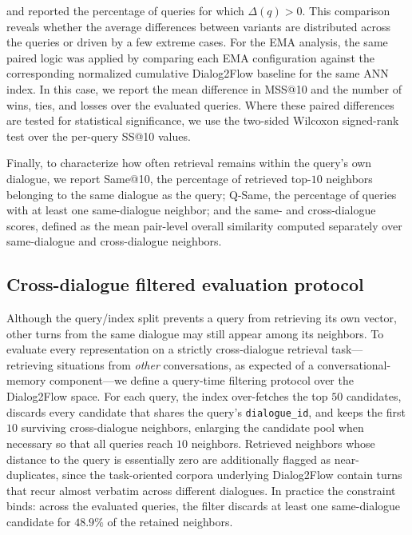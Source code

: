 \documentclass[runningheads]{llncs}
\begin{document}
\noindent and reported the percentage of queries for which $\Delta(q)>0$. This comparison reveals whether the average differences between variants are distributed across the queries or driven by a few extreme cases. For the EMA analysis, the same paired logic was applied by comparing each EMA configuration against the corresponding normalized cumulative Dialog2Flow baseline for the same ANN index. In this case, we report the mean difference in MSS@10 and the number of wins, ties, and losses over the evaluated queries. Where these paired differences are tested for statistical significance, we use the two-sided Wilcoxon signed-rank test over the per-query SS@10 values.

Finally, to characterize how often retrieval remains within the query's own dialogue, we report Same@10, the percentage of retrieved top-$10$ neighbors belonging to the same dialogue as the query; Q-Same, the percentage of queries with at least one same-dialogue neighbor; and the same- and cross-dialogue scores, defined as the mean pair-level overall similarity computed separately over same-dialogue and cross-dialogue neighbors.

\subsection{Cross-dialogue filtered evaluation protocol}
\label{sec:crossdlg_protocol}

Although the query/index split prevents a query from retrieving its own vector, other turns from the same dialogue may still appear among its neighbors. To evaluate every representation on a strictly cross-dialogue retrieval task---retrieving situations from \emph{other} conversations, as expected of a conversational-memory component---we define a query-time filtering protocol over the Dialog2Flow space. For each query, the index over-fetches the top $50$ candidates, discards every candidate that shares the query's \texttt{dialogue\_id}, and keeps the first $10$ surviving cross-dialogue neighbors, enlarging the candidate pool when necessary so that all queries reach $10$ neighbors. Retrieved neighbors whose distance to the query is essentially zero are additionally flagged as near-duplicates, since the task-oriented corpora underlying Dialog2Flow contain turns that recur almost verbatim across different dialogues. In practice the constraint binds: across the evaluated queries, the filter discards at least one same-dialogue candidate for $48.9\%$ of the retained neighbors.
\end{document}
